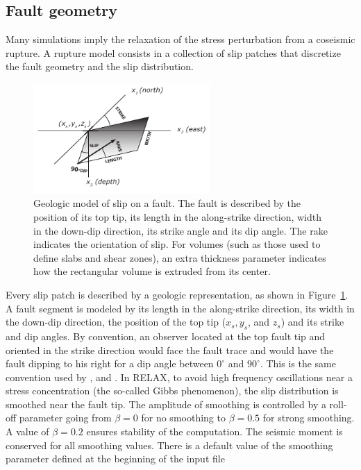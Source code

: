 \documentclass[10pt]{article}
\begin{document}
\subsection{Fault geometry}
Many simulations imply the relaxation of the stress perturbation from a coseismic rupture. A rupture model consists in a collection of slip patches that discretize the fault geometry and the slip distribution.
%
\begin{figure}[h]
\centering\includegraphics[width=0.6\textwidth]{geologic_fault.pdf}
\caption{Geologic model of slip on a fault. The fault is described by the position of its top tip, its length in the along-strike direction, width in the down-dip direction, its strike angle and its dip angle. The rake indicates the orientation of slip. For volumes (such as those used to define slabs and shear zones), an extra thickness parameter indicates how the rectangular volume is extruded from its center.}
\label{fig:geologic_fault}
\end{figure}
%
Every slip patch is described by a geologic representation, as shown in Figure~\ref{fig:geologic_fault}. A fault segment is modeled by its length in the along-strike direction, its width in the down-dip direction, the position of the top tip ($x_s, y_s$, and $z_s$) and its strike and dip angles. By convention, an observer located at the top fault tip and oriented in the strike direction would face the fault trace and would have the fault dipping to his right for a dip angle between $0^\circ$ and $90^\circ$. This is the same convention used by \cite{okada92}, \cite{wang+03a} and \cite{wang+06a}. In RELAX, to avoid high frequency oscillations near a stress concentration (the so-called Gibbs phenomenon), the slip distribution is smoothed near the fault tip. The amplitude of smoothing is controlled by a roll-off parameter going from $\beta=0$ for no smoothing to $\beta=0.5$ for strong smoothing. A value of $\beta=0.2$ ensures stability of the computation. The seismic moment is conserved for all smoothing values. There is a default value of the smoothing parameter defined at the beginning of the input file
\end{document}
